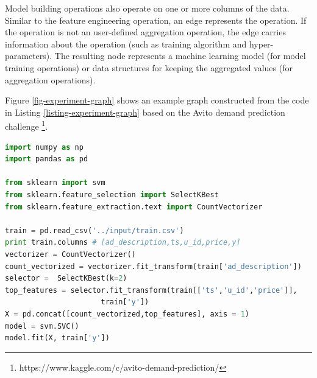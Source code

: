 Model building operations also operate on one or more columns of the data.
Similar to the feature engineering operation, an edge represents the operation.
If the operation is not an user-defined aggregation operation, the edge carries information about the operation (such as training algorithm and hyper-parameters).
The resulting node represents a machine learning model (for model training operations) or data structures for keeping the aggregated values (for aggregation operations).

Figure \ref{fig-experiment-graph} shows an example graph constructed from the code in Listing \ref{listing-experiment-graph} based on the Avito demand prediction challenge \footnote{https://www.kaggle.com/c/avito-demand-prediction/}.

\begin{lstlisting}[language=Python, caption=Example script,captionpos=b,label = {listing-experiment-graph}]
import numpy as np
import pandas as pd

from sklearn import svm
from sklearn.feature_selection import SelectKBest
from sklearn.feature_extraction.text import CountVectorizer

train = pd.read_csv('../input/train.csv') 
print train.columns # [ad_description,ts,u_id,price,y]
vectorizer = CountVectorizer()
count_vectorized = vectorizer.fit_transform(train['ad_description'])
selector =  SelectKBest(k=2)
top_features = selector.fit_transform(train[['ts','u_id','price']], 
				      train['y'])
X = pd.concat([count_vectorized,top_features], axis = 1)
model = svm.SVC()
model.fit(X, train['y'])
\end{lstlisting}


